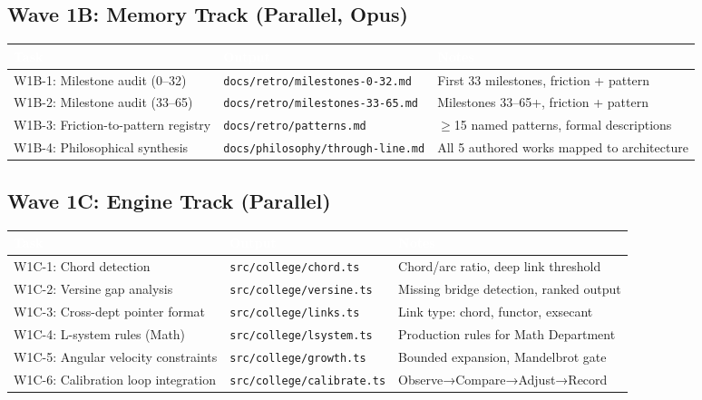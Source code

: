 \documentclass[11pt,letterpaper]{article}
\newcommand{\tableheader}[1]{\textbf{\sffamily\textcolor{white}{#1}}}
\begin{document}
\subsection{Wave 1B: Memory Track (Parallel, Opus)}

\begin{center}
\begin{tabularx}{\textwidth}{L{3cm}L{3cm}X}
\toprule
{}
\tableheader{Task} & \tableheader{Output} & \tableheader{Notes} \\
\midrule
W1B-1: Milestone audit (0--32) & \texttt{docs/retro/milestones-0-32.md} & First 33 milestones, friction + pattern \\
W1B-2: Milestone audit (33--65) & \texttt{docs/retro/milestones-33-65.md} & Milestones 33--65+, friction + pattern \\
W1B-3: Friction-to-pattern registry & \texttt{docs/retro/patterns.md} & $\geq$15 named patterns, formal descriptions \\
W1B-4: Philosophical synthesis & \texttt{docs/philosophy/through-line.md} & All 5 authored works mapped to architecture \\
\bottomrule
\end{tabularx}
\end{center}

\subsection{Wave 1C: Engine Track (Parallel)}

\begin{center}
\begin{tabularx}{\textwidth}{L{3cm}L{3cm}X}
\toprule
{}
\tableheader{Task} & \tableheader{Output} & \tableheader{Notes} \\
\midrule
W1C-1: Chord detection & \texttt{src/college/chord.ts} & Chord/arc ratio, deep link threshold \\
W1C-2: Versine gap analysis & \texttt{src/college/versine.ts} & Missing bridge detection, ranked output \\
W1C-3: Cross-dept pointer format & \texttt{src/college/links.ts} & Link type: chord, functor, exsecant \\
W1C-4: L-system rules (Math) & \texttt{src/college/lsystem.ts} & Production rules for Math Department \\
W1C-5: Angular velocity constraints & \texttt{src/college/growth.ts} & Bounded expansion, Mandelbrot gate \\
W1C-6: Calibration loop integration & \texttt{src/college/calibrate.ts} & Observe→Compare→Adjust→Record \\
\bottomrule
\end{tabularx}
\end{center}
\end{document}
